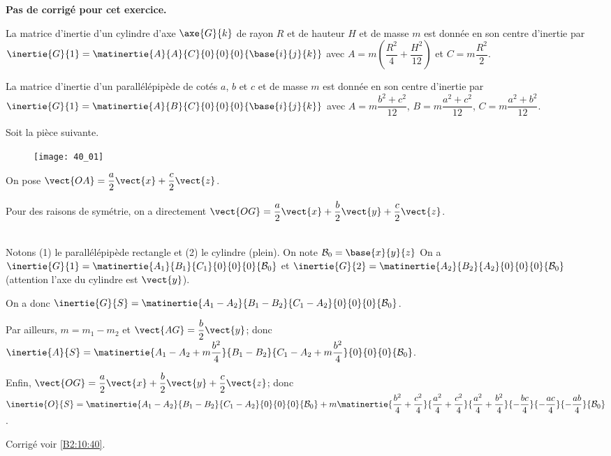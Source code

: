 \normaltrue \difficilefalse \tdifficilefalse
\correctiontrue


\setcounter{numques}{0}
\ifcorrection
\else
\textbf{Pas de corrigé pour cet exercice.}
\fi

\ifprof
\else
La matrice d'inertie d'un cylindre d'axe $\axe{G}{k}$ de rayon $R$ et de hauteur $H$ et de masse $m$ est donnée en son centre d'inertie par 
$\inertie{G}{1}=\matinertie{A}{A}{C}{0}{0}{0}{\base{i}{j}{k}}$ avec $A=m\left(\dfrac{R^2}{4}+\dfrac{H^2}{12} \right)$ et $C=m\dfrac{R^2}{2}$. 


La matrice d'inertie d'un parallélépipède de cotés $a$, $b$ et $c$ et de masse $m$ est donnée en son centre d'inertie par 
$\inertie{G}{1}=\matinertie{A}{B}{C}{0}{0}{0}{\base{i}{j}{k}}$ avec $A={m\dfrac{b^2+c^2}{12}}$, $B={m\dfrac{a^2+c^2}{12}}$, $C={m\dfrac{a^2+b^2}{12}}$.

Soit la pièce suivante. 
\begin{figure}[H]
\centering
\texttt{[image: 40\_01]}
\end{figure}

On pose $\vect{OA}=\dfrac{a}{2}\vect{x}+\dfrac{c}{2}\vect{z}$. 
\fi



\ifprof
Pour des raisons de symétrie, on a directement $\vect{OG}=\dfrac{a}{2}\vect{x}+\dfrac{b}{2}\vect{y}+\dfrac{c}{2}\vect{z}$.
\else
\fi

\ifprof ~\\
Notons (1) le parallélépipède rectangle et (2) le cylindre (plein). On note $\mathcal{B}_0=\base{x}{y}{z}$
On a $\inertie{G}{1}=\matinertie{A_1}{B_1}{C_1}{0}{0}{0}{\mathcal{B}_0}$ et
$\inertie{G}{2}=\matinertie{A_2}{B_2}{A_2}{0}{0}{0}{\mathcal{B}_0}$ (attention l'axe du cylindre est $\vect{y}$).

On a donc $\inertie{G}{S}=\matinertie{A_1-A_2}{B_1-B_2}{C_1-A_2}{0}{0}{0}{\mathcal{B}_0}$.

Par ailleurs, $m=m_1-m_2$
et $\vect{AG}=\dfrac{b}{2}\vect{y}$; donc $\inertie{A}{S}=\matinertie{A_1-A_2+m\dfrac{b^2}{4}}{B_1-B_2}{C_1-A_2+m\dfrac{b^2}{4}}{0}{0}{0}{\mathcal{B}_0}$.

Enfin, $\vect{OG}=\dfrac{a}{2}\vect{x}+\dfrac{b}{2}\vect{y}+\dfrac{c}{2}\vect{z}$; donc
 $\inertie{O}{S}=
\matinertie{A_1-A_2}{B_1-B_2}{C_1-A_2}{0}{0}{0}{\mathcal{B}_0}
+m\matinertie{\dfrac{b^2}{4}+\dfrac{c^2}{4}}{\dfrac{a^2}{4}+\dfrac{c^2}{4}}{\dfrac{a^2}{4}+\dfrac{b^2}{4}}{-\dfrac{bc}{4}}{-\dfrac{ac}{4}}{-\dfrac{ab}{4}}{\mathcal{B}_0}$.
\else
\fi


\ifprof
\else
\begin{flushright}
\footnotesize{Corrigé voir \ref{B2:10:40}.}
\end{flushright}%
\fi
